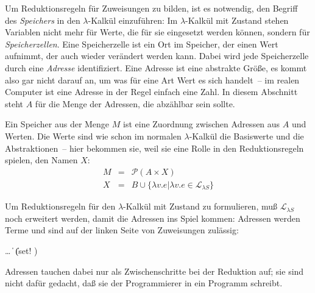 Um Reduktionsregeln für Zuweisungen zu bilden, ist es notwendig, den
Begriff des \textit{Speichers} in den $\lambda$-Kalkül
einzuführen: Im $\lambda$-Kalkül mit Zustand stehen Variablen nicht
mehr für Werte, die für sie eingesetzt werden können, sondern für
\textit{Speicherzellen}.  Eine Speicherzelle ist
ein Ort im Speicher, der einen Wert aufnimmt, der auch wieder
verändert werden kann.  Dabei wird jede Speicherzelle durch eine
\textit{Adresse} identifiziert.  Eine Adresse ist eine
abstrakte Größe, es kommt also gar nicht darauf an, um was für
eine Art Wert es sich handelt~-- im realen Computer ist eine Adresse
in der Regel einfach eine Zahl.  In diesem Abschnitt steht $A$ für die
Menge der Adressen, die abzählbar sein sollte.

Ein Speicher aus der Menge $M$ ist eine Zuordnung zwischen Adressen aus $A$
und Werten.  Die Werte sind wie schon im normalen
$\lambda$-Kalkül die Basiswerte und die Abstraktionen~-- hier bekommen
sie, weil sie eine Rolle in den Reduktionsregeln spielen, den Namen
$X$:
%
\begin{eqnarray*}
  M &=& \mathcal{P}(A\times X)\\
  X &=& B \cup \{ \lambda v.e | \lambda v.e \in \mathcal{L}_{\lambda{}S} \}
\end{eqnarray*}

Um Reduktionsregeln für den $\lambda$-Kalkül mit Zustand zu
formulieren, muß $\mathcal{L}_{\lambda{}S}$ noch erweitert werden,
damit die Adressen ins Spiel kommen: Adressen werden Terme und sind
auf der linken Seite von Zuweisungen zulässig:
%
\begin{grammar}
   \: \ldots
  \> \| 
  \> \| (set!  )
\end{grammar}
%
Adressen tauchen dabei nur als Zwischenschritte bei der Reduktion auf;
sie sind nicht dafür gedacht, daß sie der Programmierer in ein
Programm schreibt.

